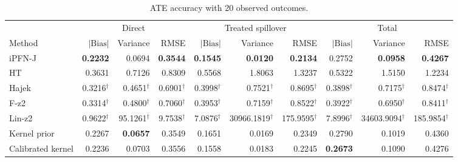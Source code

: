 \begin{table}[tb]
\centering
\caption{ATE accuracy with 20 observed outcomes.}
\begingroup\footnotesize
\setlength{\tabcolsep}{3pt}
\begin{tabular*}{\linewidth}{@{\extracolsep{\fill}}l*{9}{r}@{}}
\toprule
&\multicolumn{3}{c}{Direct}&\multicolumn{3}{c}{Treated spillover}&\multicolumn{3}{c}{Total}\\
\cmidrule(lr){2-4}\cmidrule(lr){5-7}\cmidrule(lr){8-10}
Method&$|\mathrm{Bias}|$&Variance&RMSE&$|\mathrm{Bias}|$&Variance&RMSE&$|\mathrm{Bias}|$&Variance&RMSE\\
\midrule
iPFN-J & \cellcolor{blue!24}\textbf{0.2232} & \cellcolor{blue!17}0.0694 & \cellcolor{blue!24}\textbf{0.3544} & \cellcolor{blue!24}\textbf{0.1545} & \cellcolor{blue!24}\textbf{0.0120} & \cellcolor{blue!24}\textbf{0.2134} & \cellcolor{blue!17}0.2752 & \cellcolor{blue!24}\textbf{0.0958} & \cellcolor{blue!24}\textbf{0.4267} \\
HT & \cellcolor{blue!4}0.3631 & \cellcolor{blue!4}0.7126 & \cellcolor{blue!4}0.8309 & \cellcolor{blue!4}0.5568 & \cellcolor{blue!4}1.8063 & \cellcolor{blue!4}1.3237 & \cellcolor{blue!4}0.5322 & \cellcolor{blue!4}1.5150 & \cellcolor{blue!4}1.2234 \\
Hajek & 0.3216$^{\dagger}$ & 0.4651$^{\dagger}$ & 0.6901$^{\dagger}$ & 0.3998$^{\dagger}$ & 0.7521$^{\dagger}$ & 0.8695$^{\dagger}$ & 0.3898$^{\dagger}$ & 0.7175$^{\dagger}$ & 0.8474$^{\dagger}$ \\
F-z2 & 0.3314$^{\dagger}$ & 0.4800$^{\dagger}$ & 0.7060$^{\dagger}$ & 0.3953$^{\dagger}$ & 0.7159$^{\dagger}$ & 0.8522$^{\dagger}$ & 0.3922$^{\dagger}$ & 0.6950$^{\dagger}$ & 0.8411$^{\dagger}$ \\
Lin-z2 & 0.9622$^{\dagger}$ & 95.1261$^{\dagger}$ & 9.7538$^{\dagger}$ & 7.0876$^{\dagger}$ & 30966.1819$^{\dagger}$ & 175.9595$^{\dagger}$ & 7.8996$^{\dagger}$ & 34603.9094$^{\dagger}$ & 185.9854$^{\dagger}$ \\
Kernel prior & \cellcolor{blue!7}0.2267 & \cellcolor{blue!24}\textbf{0.0657} & \cellcolor{blue!11}0.3549 & \cellcolor{blue!7}0.1651 & \cellcolor{blue!11}0.0169 & \cellcolor{blue!7}0.2349 & \cellcolor{blue!7}0.2790 & \cellcolor{blue!11}0.1019 & \cellcolor{blue!7}0.4360 \\
Calibrated kernel & \cellcolor{blue!11}0.2236 & \cellcolor{blue!7}0.0703 & \cellcolor{blue!7}0.3556 & \cellcolor{blue!11}0.1558 & \cellcolor{blue!7}0.0183 & \cellcolor{blue!11}0.2245 & \cellcolor{blue!24}\textbf{0.2673} & \cellcolor{blue!7}0.1090 & \cellcolor{blue!11}0.4276 \\

\end{tabular*}
\end{table}
